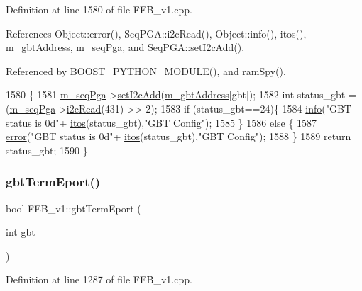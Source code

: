 Definition at line 1580 of file F\+E\+B\+\_\+v1.\+cpp.



References Object\+::error(), Seq\+P\+G\+A\+::i2c\+Read(), Object\+::info(), itos(), m\+\_\+gbt\+Address, m\+\_\+seq\+Pga, and Seq\+P\+G\+A\+::set\+I2c\+Add().



Referenced by B\+O\+O\+S\+T\+\_\+\+P\+Y\+T\+H\+O\+N\+\_\+\+M\+O\+D\+U\+L\+E(), and ram\+Spy().


\begin{DoxyCode}
1580                             \{
1581   \hyperlink{classFEB__v1_a6c7804ac86796f233a8393043adf2e77}{m\_seqPga}->\hyperlink{classSeqPGA_a4ef334e4d2cb417b49033dce951728cd}{setI2cAdd}(\hyperlink{classFEB__v1_ac625855df976f16694178f1a4c0eef1e}{m\_gbtAddress}[gbt]);
1582   \textcolor{keywordtype}{int} status\_gbt = (\hyperlink{classFEB__v1_a6c7804ac86796f233a8393043adf2e77}{m\_seqPga}->\hyperlink{classSeqPGA_a7cd344df2be99f3a02b487f80e87b27e}{i2cRead}(431) >> 2);
1583   \textcolor{keywordflow}{if} (status\_gbt==24)\{
1584     \hyperlink{classObject_a644fd329ea4cb85f54fa6846484b84a8}{info}(\textcolor{stringliteral}{"GBT status is 0d"}+ \hyperlink{Tools_8h_af330027dbdafb9a30768b3613c553e60}{itos}(status\_gbt),\textcolor{stringliteral}{"GBT Config"});
1585   \}
1586   \textcolor{keywordflow}{else} \{
1587     \hyperlink{classObject_a204a95f57818c0f811933917a30eff45}{error}(\textcolor{stringliteral}{"GBT status is 0d"}+ \hyperlink{Tools_8h_af330027dbdafb9a30768b3613c553e60}{itos}(status\_gbt),\textcolor{stringliteral}{"GBT Config"});
1588   \}
1589   \textcolor{keywordflow}{return} status\_gbt;
1590 \}
\end{DoxyCode}
\mbox{\label{classFEB__v1_a84fa302a012eee663fe21829866fb20e}} 
\subsubsection{\texorpdfstring{gbt\+Term\+Eport()}{gbtTermEport()}}
{\footnotesize\ttfamily bool F\+E\+B\+\_\+v1\+::gbt\+Term\+Eport (\begin{DoxyParamCaption}\item[{int}]{gbt }\end{DoxyParamCaption})}



Definition at line 1287 of file F\+E\+B\+\_\+v1.\+cpp.



